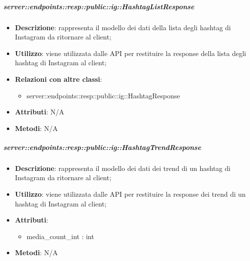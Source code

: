     \subparagraph{server::endpoints::resp::public::ig::HashtagListResponse} %
    \label{subp:bdsm_app_server_endpoints_resp_public_ig_hashtaglistresponse}
    \begin{itemize}
      \item \textbf{Descrizione}: rappresenta il modello dei dati della lista degli hashtag di Instagram da ritornare al client;
      \item \textbf{Utilizzo}: viene utilizzata dalle API per restituire la response della lista degli hashtag di Instagram al client;
      \item \textbf{Relazioni con altre classi}:
        \begin{itemize}
          \item server::endpoints::resp::public::ig::HashtagResponse
        \end{itemize}
	  \item \textbf{Attributi}: N/A
	  \item \textbf{Metodi}: N/A
      \end{itemize}

    \subparagraph{server::endpoints::resp::public::ig::HashtagTrendResponse} %
    \label{subp:bdsm_app_server_endpoints_resp_public_ig_hashtagtrendresponse}
    \begin{itemize}
      \item \textbf{Descrizione}: rappresenta il modello dei dati dei trend di un hashtag di Instagram da ritornare al client;
      \item \textbf{Utilizzo}: viene utilizzata dalle API per restituire la response dei trend di un hashtag di Instagram al client;
      
	  \item \textbf{Attributi}: 
	  	\begin{itemize}
	  		\item media\_count\_int : int
	  	\end{itemize}
	  \item \textbf{Metodi}: N/A
      \end{itemize}

